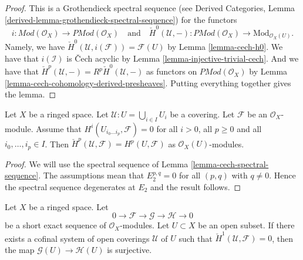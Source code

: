 \begin{proof}
This is a Grothendieck spectral sequence
(see
Derived Categories, Lemma \ref{derived-lemma-grothendieck-spectral-sequence})
for the functors
$$
i :  \textit{Mod}(\mathcal{O}_X) \to \textit{PMod}(\mathcal{O}_X)
\quad\text{and}\quad
\check{H}^0(\mathcal{U}, - ) : \textit{PMod}(\mathcal{O}_X)
\to \text{Mod}_{\mathcal{O}_X(U)}.
$$
Namely, we have $\check{H}^0(\mathcal{U}, i(\mathcal{F})) = \mathcal{F}(U)$
by Lemma \ref{lemma-cech-h0}. We have that $i(\mathcal{I})$ is
{\v C}ech acyclic by Lemma \ref{lemma-injective-trivial-cech}. And we
have that $\check{H}^p(\mathcal{U}, -) = R^p\check{H}^0(\mathcal{U}, -)$
as functors on $\textit{PMod}(\mathcal{O}_X)$
by Lemma \ref{lemma-cech-cohomology-derived-presheaves}.
Putting everything together gives the lemma.
\end{proof}

\begin{lemma}
\label{lemma-cech-spectral-sequence-application}
Let $X$ be a ringed space.
Let $\mathcal{U} : U = \bigcup_{i \in I} U_i$ be a covering.
Let $\mathcal{F}$ be an $\mathcal{O}_X$-module.
Assume that $H^i(U_{i_0 \ldots i_p}, \mathcal{F}) = 0$
for all $i > 0$, all $p \geq 0$ and all $i_0, \ldots, i_p \in I$.
Then $\check{H}^p(\mathcal{U}, \mathcal{F}) = H^p(U, \mathcal{F})$
as $\mathcal{O}_X(U)$-modules.
\end{lemma}

\begin{proof}
We will use the spectral sequence of
Lemma \ref{lemma-cech-spectral-sequence}.
The assumptions mean that $E_2^{p, q} = 0$ for all $(p, q)$ with
$q \not = 0$. Hence the spectral sequence degenerates at $E_2$
and the result follows.
\end{proof}

\begin{lemma}
\label{lemma-ses-cech-h1}
Let $X$ be a ringed space.
Let
$$
0 \to \mathcal{F} \to \mathcal{G} \to \mathcal{H} \to 0
$$
be a short exact sequence of $\mathcal{O}_X$-modules.
Let $U \subset X$ be an open subset.
If there exists a cofinal system of open coverings $\mathcal{U}$
of $U$ such that $\check{H}^1(\mathcal{U}, \mathcal{F}) = 0$,
then the map $\mathcal{G}(U) \to \mathcal{H}(U)$ is
surjective.
\end{lemma}

